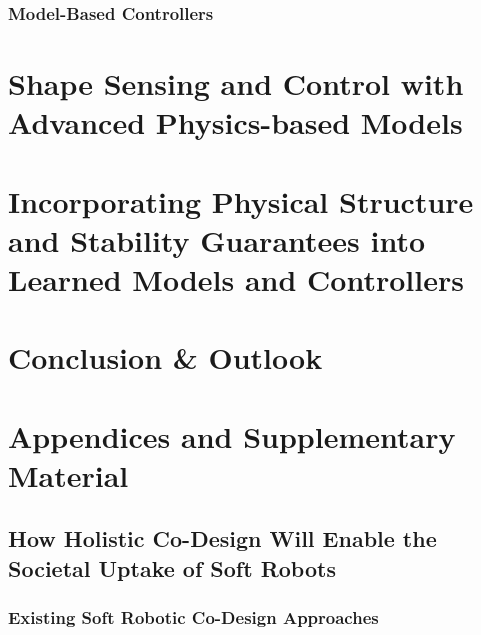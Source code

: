 \documentclass{dissertation}
\begin{document}
\section{Model-Based Controllers}




\part{Shape Sensing and Control with Advanced Physics-based Models}\label{part:physicsmodels}






\part{Incorporating Physical Structure and Stability Guarantees into Learned Models and Controllers}\label{part:learning}







\part{Conclusion \& Outlook}


\part{Appendices and Supplementary Material}
\appendix



\chapter{How Holistic Co-Design Will Enable the Societal Uptake of Soft Robots}\label{chp:towardscodesign}
\section{Existing Soft Robotic Co-Design Approaches}
\end{document}
